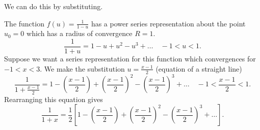 \documentclass[../multivariate_calculus.tex]{subfiles}
\begin{document}
        We can do this by substituting.
        \begin{example}
            The function $f(u)=\frac{1}{1-u}$ has a power series representation about the point $u_0=0$ which has a radius of convergence $R=1$.
            \begin{equation}
                \frac{1}{1+u}=1-u+u^2-u^3+\dots\quad-1<u<1.
            \end{equation}
            Suppose we want a series representation for this function which convergences for $-1<x<3$.
            We make the substitution $u=\frac{x-1}{2}$ (equation of a straight line)
            \begin{equation}
                \frac{1}{1+\frac{x-1}{2}}=1-\left(\frac{x-1}{2}\right)+\left(\frac{x-1}{2}\right)^2-\left(\frac{x-1}{2}\right)^3+\dots\quad-1<\frac{x-1}{2}<1.
            \end{equation}
            Rearranging this equation gives
            \begin{equation}
                \frac{1}{1+x}=\frac{1}{2}\left[1-\left(\frac{x-1}{2}\right)+\left(\frac{x-1}{2}\right)^2-\left(\frac{x-1}{2}\right)^3+\dots\right].
            \end{equation}
        \end{example}
\end{document}
